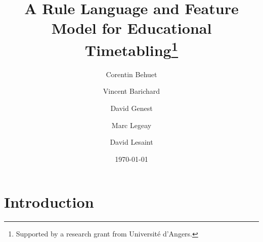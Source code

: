 \documentclass[runningheads]{llncs}
\date{\today}
\begin{document}


\title{A Rule Language and Feature Model for Educational Timetabling\thanks{Supported by a research grant from Université d'Angers.}}
%
%
\author{
Corentin Behuet \and
Vincent Barichard \and
David Genest \and
Marc Legeay \and
David Lesaint
}
%
%
%
\maketitle              %


\section{Introduction}







\printbibliography

\appendix

\end{document}
